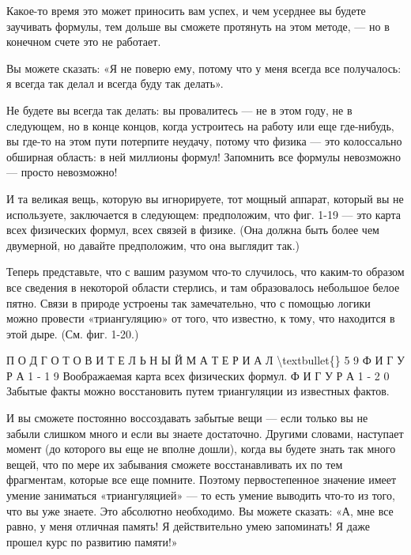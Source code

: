 \documentclass[10pt,oneside]{article}
\newcommand{\TipsSubsection}[1]{\par\vspace{6bp}{\normalsize\bfseries #1\par}\vspace{2bp}}
\begin{document}
\TipsSubsection{1-10 Триангуляция У меня осталось еще несколько минут, поэтому мне хотелось бы сказать пару слов о связи математики с физикой --- связи, которая, собственно, была хорошо проиллюстрирована этим простым примером. Бесполезно просто заучивать формулы и говорить себе: «Я знаю все формулы; мне нужно лишь сообразить, как подставить их в задачу!»}

Какое-то время это может приносить вам успех, и чем усерднее вы будете заучивать формулы, тем дольше вы сможете протянуть на этом методе, --- но в конечном счете это не работает.\par

Вы можете сказать: «Я не поверю ему, потому что у меня всегда все получалось: я всегда так делал и всегда буду так делать».\par

Не будете вы всегда так делать: вы провалитесь --- не в этом году, не в следующем, но в конце концов, когда устроитесь на работу или еще где-нибудь, вы где-то на этом пути потерпите неудачу, потому что физика --- это колоссально обширная область: в ней миллионы формул! Запомнить все формулы невозможно --- просто невозможно!\par

И та великая вещь, которую вы игнорируете, тот мощный аппарат, который вы не используете, заключается в следующем: предположим, что фиг. 1-19 --- это карта всех физических формул, всех связей в физике. (Она должна быть более чем двумерной, но давайте предположим, что она выглядит так.)\par

Теперь представьте, что с вашим разумом что-то случилось, что каким-то образом все сведения в некоторой области стерлись, и там образовалось небольшое белое пятно. Связи в природе устроены так замечательно, что с помощью логики можно провести «триангуляцию» от того, что известно, к тому, что находится в этой дыре. (См. фиг. 1-20.)\par

П О Д Г О Т О В И Т Е Л Ь Н Ы Й  М А Т Е Р И А Л \textbackslash{}textbullet\{\} 5 9 Ф И Г У Р А  1 - 1 9 Воображаемая карта всех физических формул. Ф И Г У Р А  1 - 2 0 Забытые факты можно восстановить путем триангуляции из известных фактов.\par

И вы сможете постоянно воссоздавать забытые вещи --- если только вы не забыли слишком много и если вы знаете достаточно. Другими словами, наступает момент (до которого вы еще не вполне дошли), когда вы будете знать так много вещей, что по мере их забывания сможете восстанавливать их по тем фрагментам, которые все еще помните. Поэтому первостепенное значение имеет умение заниматься «триангуляцией» --- то есть умение выводить что-то из того, что вы уже знаете. Это абсолютно необходимо. Вы можете сказать: «А, мне все равно, у меня отличная память! Я действительно умею запоминать! Я даже прошел курс по развитию памяти!»\par
\end{document}
